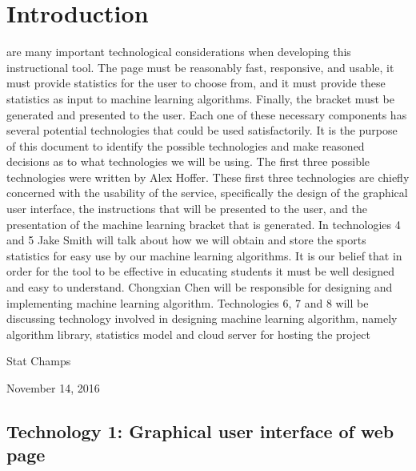 \documentclass[journal,onecolumn]{IEEEtran}
\begin{document}
\section{Introduction}
% 
% 
% 
% 
 are many important technological considerations when developing this instructional tool. The page must be reasonably fast, responsive, and usable, it must provide statistics for the user to choose from, and it must provide these statistics as input to machine learning algorithms. Finally, the bracket must be generated and presented to the user. Each one of these necessary components has several potential technologies that could be used satisfactorily. It is the purpose of this document to identify the possible technologies and make reasoned decisions as to what technologies we will be using. The first three possible technologies were written by Alex Hoffer. These first three technologies are chiefly concerned with the usability of the service, specifically the design of the graphical user interface, the instructions that will be presented to the user, and the presentation of the machine learning bracket that is generated. In technologies 4 and 5 Jake Smith will talk about how we will obtain and store the sports statistics for easy use by our machine learning algorithms. It is our belief that in order for the tool to be effective in educating students it must be well designed and easy to understand. Chongxian Chen will be responsible for designing and implementing machine learning algorithm. Technologies 6, 7 and 8  will be discussing technology involved in designing machine learning algorithm, namely algorithm library, statistics model and cloud server for hosting the project %

\hfill Stat Champs
 
\hfill November 14, 2016

\subsection{Technology 1: Graphical user interface of web page}
\end{document}
